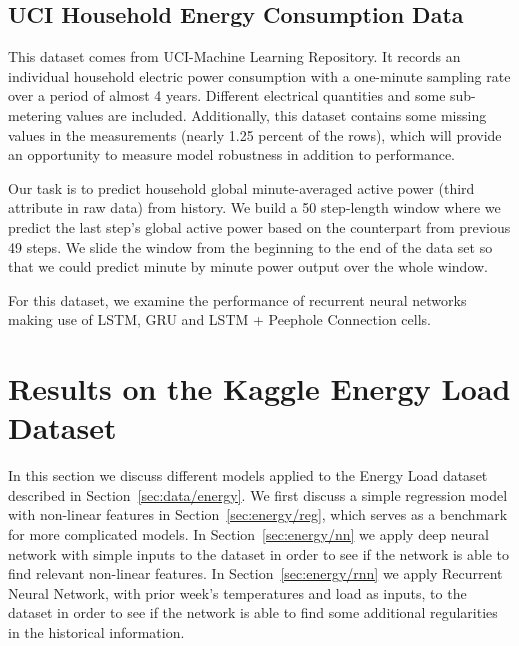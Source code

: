 \documentclass{article} %
\begin{document}
\subsection{UCI Household Energy Consumption Data}
\label{sec:data/house}

This dataset comes from UCI-Machine Learning Repository. It records an individual household electric power consumption with a one-minute sampling rate over a period of almost 4 years. Different electrical quantities and some sub-metering values are included. Additionally, this dataset contains some missing values in the measurements (nearly 1.25 percent of the rows), which will provide an opportunity to measure model robustness in addition to performance.

Our task is to predict household global minute-averaged active power (third attribute in raw data) from history. We build a 50 step-length window where we predict the last step's global active power based on the counterpart from previous 49 steps. We slide the window from the beginning to the end of the data set so that we could predict minute by minute power output over the whole window.

For this dataset, we examine the performance of recurrent neural networks making use of LSTM, GRU and LSTM + Peephole Connection cells. 



\section{Results on the Kaggle Energy Load Dataset}
\label{sec:energy}

In this section we discuss different models applied to the Energy Load dataset
described in Section~\ref{sec:data/energy}.
We first discuss a simple regression model with non-linear features
in Section~\ref{sec:energy/reg}, which serves as a benchmark for more 
complicated models.
In Section~\ref{sec:energy/nn} we apply deep neural network with simple inputs
to the dataset in order to see if the network is able to find relevant 
non-linear features.
In Section~\ref{sec:energy/rnn} we apply Recurrent Neural Network,
with prior week's temperatures and load as inputs, to the dataset
in order to see if the network is able to find some additional
regularities in the historical information.
\end{document}
